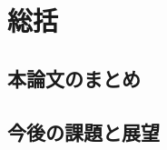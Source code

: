 \chapter{総括}
\section{本論文のまとめ}
\label{sec:Summary}






\section{今後の課題と展望}
\label{sec:Challenges}



